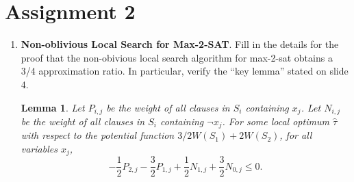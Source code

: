 \documentclass[11pt]{article}
\newtheorem{lemma}{Lemma}
\begin{document}
\section*{Assignment 2}

\begin{enumerate}[leftmargin=16pt]
    \item \textbf{Non-oblivious Local Search for Max-2-SAT}.
    Fill in the details for the proof that the non-obivious local search algorithm for max-2-sat obtains a 3/4 approximation ratio. In particular, verify the “key lemma” stated on slide 4.

    \begin{lemma}
    Let $P_{i,j}$ be the weight of all clauses in $S_i$ containing $x_j$. Let $N_{i,j}$ be the weight of all clauses in $S_i$ containing $\neg x_j$. For some local optimum $\hat{\tau}$ with respect to the potential function $3/2 W(S_1) + 2W(S_2)$, for all variables $x_j$,
    $$
    -\frac{1}{2} P_{2,j} - \frac{3}{2} P_{1,j} + \frac{1}{2} N_{1,j} + \frac{3}{2} N_{0,j} \leq 0.
    $$
    \end{lemma}


\end{enumerate}
\end{document}

